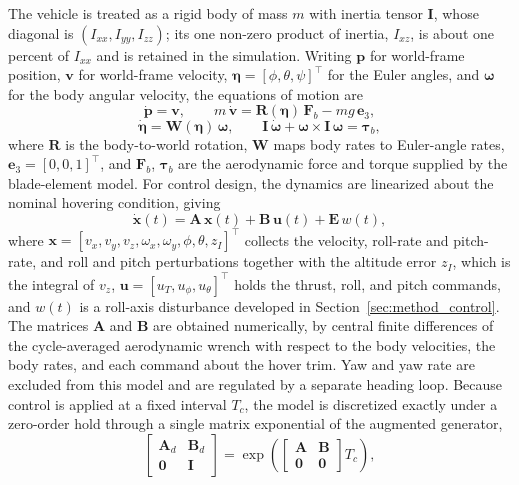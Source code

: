 \documentclass[final,5p,times]{elsarticle}
\begin{document}
The vehicle is treated as a rigid body of mass $m$ with inertia tensor $\mathbf{I}$, whose diagonal is $(I_{xx}, I_{yy}, I_{zz})$; its one non-zero product of inertia, $I_{xz}$, is about one percent of $I_{xx}$ and is retained in the simulation. Writing $\mathbf{p}$ for world-frame position, $\mathbf{v}$ for world-frame velocity, $\boldsymbol{\eta} = [\phi, \theta, \psi]^\top$ for the Euler angles, and $\boldsymbol{\omega}$ for the body angular velocity, the equations of motion are
\begin{equation}
    \dot{\mathbf{p}} = \mathbf{v}, \qquad m\,\dot{\mathbf{v}} = \mathbf{R}(\boldsymbol{\eta})\,\mathbf{F}_b - m g\,\mathbf{e}_3,
    \label{eq:trans}
\end{equation}
\begin{equation}
    \dot{\boldsymbol{\eta}} = \mathbf{W}(\boldsymbol{\eta})\,\boldsymbol{\omega}, \qquad \mathbf{I}\,\dot{\boldsymbol{\omega}} + \boldsymbol{\omega} \times \mathbf{I}\,\boldsymbol{\omega} = \boldsymbol{\tau}_b,
    \label{eq:rot}
\end{equation}
where $\mathbf{R}$ is the body-to-world rotation, $\mathbf{W}$ maps body rates to Euler-angle rates, $\mathbf{e}_3 = [0,0,1]^\top$, and $\mathbf{F}_b$, $\boldsymbol{\tau}_b$ are the aerodynamic force and torque supplied by the blade-element model. For control design, the dynamics are linearized about the nominal hovering condition, giving
\begin{equation}
    \dot{\mathbf{x}}(t) = \mathbf{A}\,\mathbf{x}(t) + \mathbf{B}\,\mathbf{u}(t) + \mathbf{E}\,w(t),
    \label{eq:cont_ss}
\end{equation}
where $\mathbf{x} = [v_x, v_y, v_z, \omega_x, \omega_y, \phi, \theta, z_I]^\top$ collects the velocity, roll-rate and pitch-rate, and roll and pitch perturbations together with the altitude error $z_I$, which is the integral of $v_z$, $\mathbf{u} = [u_T, u_\phi, u_\theta]^\top$ holds the thrust, roll, and pitch commands, and $w(t)$ is a roll-axis disturbance developed in Section~\ref{sec:method_control}. The matrices $\mathbf{A}$ and $\mathbf{B}$ are obtained numerically, by central finite differences of the cycle-averaged aerodynamic wrench with respect to the body velocities, the body rates, and each command about the hover trim. Yaw and yaw rate are excluded from this model and are regulated by a separate heading loop. Because control is applied at a fixed interval $T_c$, the model is discretized exactly under a zero-order hold through a single matrix exponential of the augmented generator,
\begin{equation}
    \begin{bmatrix} \mathbf{A}_d & \mathbf{B}_d \\ \mathbf{0} & \mathbf{I} \end{bmatrix} = \exp\!\left( \begin{bmatrix} \mathbf{A} & \mathbf{B} \\ \mathbf{0} & \mathbf{0} \end{bmatrix} T_c \right),
    \label{eq:zoh}
\end{equation}
\end{document}
